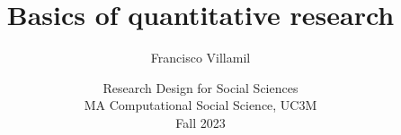 \documentclass[aspectratio=43]{beamer}
\title[Lecture 2: Basics of quantitative research]{\Large Basics of quantitative research}
\author[]{Francisco Villamil}
\date[]{Research Design for Social Sciences\\MA Computational Social Science, UC3M\\Fall 2023}
\begin{document}

\begin{frame}
  \titlepage
\end{frame}


\end{document}
